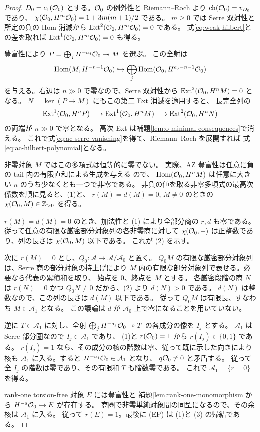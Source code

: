 \begin{proof}
$D_0=c_1(\mathcal O_0)$ とする。$\mathcal O_0$ の例外性と Riemann--Roch より
$\operatorname{ch}(\mathcal O_0)=v_{D_0}$ であり、
$\chi(\mathcal O_0,H^m\mathcal O_0)=1+3m(m+1)/2$ である。
$m\ge0$ では Serre 双対性と所定の負の Hom 消滅から
$\operatorname{Ext}^2(\mathcal O_0,H^m\mathcal O_0)=0$ である。
式\eqref{eq:weak-hilbert}との差を取れば
$\operatorname{Ext}^1(\mathcal O_0,H^m\mathcal O_0)=0$ も得る。

豊富性により $P=\bigoplus_jH^{-a_j}\mathcal O_0\twoheadrightarrow M$ を選ぶ。
この全射は
\[
 \operatorname{Hom}(M,H^{-n-1}\mathcal O_0)
 \hookrightarrow\bigoplus_j\operatorname{Hom}(\mathcal O_0,H^{a_j-n-1}\mathcal O_0)
\]
を与える。右辺は $n\gg0$ で零なので、Serre 双対性から
$\operatorname{Ext}^2(\mathcal O_0,H^nM)=0$ となる。
$N=\ker(P\to M)$ にもこの第二 Ext 消滅を適用すると、
長完全列の
\[
 \operatorname{Ext}^1(\mathcal O_0,H^nP)\longrightarrow\operatorname{Ext}^1(\mathcal O_0,H^nM)
 \longrightarrow\operatorname{Ext}^2(\mathcal O_0,H^nN)
\]
の両端が $n\gg0$ で零となる。
高次 Ext は補題\ref{lem:o-minimal-consequences}で消える。
これで式\eqref{eq:ac-serre-vanishing}を得て、Riemann--Roch を展開すれば
式\eqref{eq:ac-hilbert-polynomial}となる。

非零対象 $M$ ではこの多項式は恒等的に零でない。
実際、AZ 豊富性は任意に負の tail 内の有限直和による生成を与える
\cite[Lemma 2.1(ii)]{PolishchukProj}ので、
$\operatorname{Hom}(\mathcal O_0,H^nM)$ は任意に大きい $n$ のうち少なくとも一つで非零である。
非負の値を取る非零多項式の最高次係数を順に見ると、(1)と、
$r(M)=d(M)=0$, $M\ne0$ のときの $\chi(\mathcal O_0,M)\in\mathbb Z_{>0}$ を得る。

$r(M)=d(M)=0$ のとき、加法性と (1) により全部分商の $r,d$ も零である。
従って任意の有限な厳密部分対象列の各非零商に対して
$\chi(\mathcal O_0,-)$ は正整数であり、列の長さは $\chi(\mathcal O_0,M)$ 以下である。
これが (2) を示す。

次に $r(M)=0$ とし、$Q_0:\mathcal A\to\mathcal A/\mathcal A_0$ と置く。
$Q_0M$ の有限な厳密部分対象列は、Serre 商の部分対象の持上げにより
$M$ 内の有限な部分対象列で表せる。必要なら代表の累積和を取り、
始点を $0$、終点を $M$ とする。
各厳密段階の商 $N$ は $r(N)=0$ かつ $Q_0N\ne0$ だから、(2) より $d(N)>0$ である。
$d(N)$ は整数なので、この列の長さは $d(M)$ 以下である。
従って $Q_0M$ は有限長、すなわち $M\in\mathcal A_1$ となる。
この議論は $d$ が $\mathcal A_0$ 上で零になることを用いていない。

逆に $T\in\mathcal A_1$ に対し、全射
$\bigoplus_jH^{-a_j}\mathcal O_0\twoheadrightarrow T$ の各成分の像を $I_j$ とする。
$\mathcal A_1$ は Serre 部分圏なので $I_j\in\mathcal A_1$ であり、
(1)と $r(\mathcal O_0)=1$ から $r(I_j)\in\{0,1\}$ である。
$r(I_j)=1$ なら、その成分の核の階数は零、従って既に示した向きにより
核も $\mathcal A_1$ に入る。すると $H^{-a_j}\mathcal O_0\in\mathcal A_1$ となり、
$q\mathcal O_0\ne0$ と矛盾する。
従って全 $I_j$ の階数は零であり、その有限和 $T$ も階数零である。
これで $\mathcal A_1=\{r=0\}$ を得る。

rank-one torsion-free 対象 $E$ には豊富性と
補題\ref{lem:rank-one-monomorphism}から $H^{-a}\mathcal O_0\hookrightarrow E$ が存在する。
商圏で非零単純対象間の同型になるので、その余核は $\mathcal A_1$ に入る。
従って $r(E)=1$。最後に (EP) は (1)と (3) の帰結である。
\end{proof}

